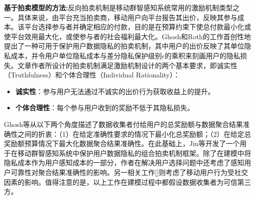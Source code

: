 \textbf{基于拍卖模型的方法:}反向拍卖机制是移动群智感知系统常用的激励机制类型之一。具体来说，由平台充当拍卖商，移动用户向平台报告其出价，反映其参与成本。该平台选择参与者并确定相应的付款，目的是在预算约束下使总付款最小化或使平台效用最大化，或使参与者的社会福利最大化\cite{DejunJ}。Ghosh和Roth的工作\cite{ghosh2015selling}首创性地提出了一种可用于保护用户数据隐私的拍卖机制，其中用户的出价反映了其单位隐私成本，并令用户单位隐私成本与差分隐私保护级别$\epsilon$的乘积来刻画用户的隐私损失。文章作者所设计的拍卖机制满足激励机制设计的两个基本要求，即诚实性（Truthfulness）和个体合理性（Individual Rationality）：
\begin{itemize}
\item \textbf{诚实性}：参与用户无法通过不诚实的出价行为获取收益上的提升。
\item \textbf{个体合理性}：每个参与用户收到的奖励不低于其隐私损失。
\end{itemize}
Ghosh等\cite{ghosh2015selling}从以下两个角度描述了数据收集者付给用户的总奖励额与数据聚合结果准确性之间的折衷：（1）在给定准确性要求的情况下最小化总奖励额；（2）在给定总奖励额预算情况下最大化数据聚合结果准确性。在此基础上，Jin等\cite{jin2016inception}开发了一个用于在移动群智感知系统中保护用户数据隐私的组合拍卖机制框架。除了在建模中将隐私成本作为用户感知成本的一部分，作者在解决用户选择问题中还考虑了感知用户可靠性对聚合结果准确性的影响。另一相关工作[]则考虑了移动用户行为受社交因素的影响。值得注意的是，以上工作在建模过程中都假设数据收集者为可信第三方。

